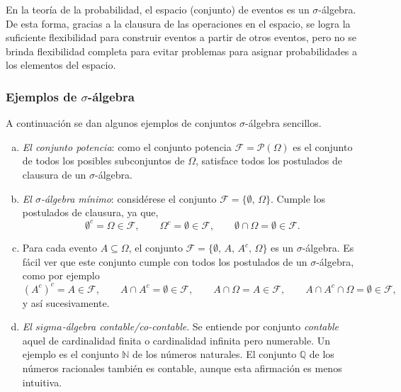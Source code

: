 \documentclass[a4paper]{report}
\begin{document}
En la teoría de la probabilidad, el espacio (conjunto) de eventos es un \(\sigma\)-álgebra. De esta forma, gracias a la clausura de las operaciones en el espacio, se logra la suficiente flexibilidad para construir eventos a partir de otros eventos, pero no se brinda flexibilidad completa para evitar problemas para asignar probabilidades a los elementos del espacio.

\subsubsection{Ejemplos de \(\sigma\)-álgebra} 

A continuación se dan algunos ejemplos de conjuntos \(\sigma\)-álgebra sencillos. 
\begin{enumerate}[(a)]
 \item \emph{El conjunto potencia}: como el conjunto potencia \(\mathcal{F}=\mathcal{P}(\Omega)\) es el conjunto de todos los posibles subconjuntos de \(\Omega\), satisface todos los postulados de clausura de un \(\sigma\)-álgebra.
 \item \emph{El \(\sigma\)-álgebra mínimo}: considérese el conjunto \(\mathcal{F}=\{\emptyset,\,\Omega\}\). Cumple los postulados de clausura, ya que,
 \[
  \emptyset^c=\Omega\in\mathcal{F},\qquad\Omega^c=\emptyset\in\mathcal{F},\qquad\emptyset\cap\Omega=\emptyset\in\mathcal{F}.
 \]
 \item Para cada evento \(A\subseteq\Omega\), el conjunto \(\mathcal{F}=\{\emptyset,\,A,\,A^c,\,\Omega\}\) es un \(\sigma\)-álgebra. Es fácil ver que este conjunto cumple con todos los postulados de un \(\sigma\)-álgebra, como por ejemplo
 \[
  (A^c)^c=A\in\mathcal{F},\qquad A\cap A^c=\emptyset\in\mathcal{F},\qquad A\cap \Omega=A\in\mathcal{F},\qquad A\cap A^c\cap\Omega=\emptyset\in\mathcal{F},
 \]
 y así sucesivamente.
 \item \emph{El \(sigma\)-álgebra contable/co-contable}. Se entiende por conjunto \emph{contable} aquel de cardinalidad finita o cardinalidad infinita pero numerable. Un ejemplo es el conjunto \(\mathbb{N}\) de los números naturales. El conjunto \(\mathbb{Q}\) de los números racionales también es contable, aunque esta afirmación es menos intuitiva.
 

\end{enumerate}
\end{document}
